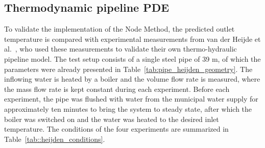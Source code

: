 


\subsection{Thermodynamic pipeline PDE}
To validate the implementation of the Node Method, the predicted outlet 
temperature is compared with experimental measurements from van der Heijde et 
al.\ \cite{VANDERHEIJDE2017158}, who used these measurements to validate their 
own thermo-hydraulic pipeline model. The test setup consists of a single steel 
pipe of 39 m, of which the parameters were already presented in 
Table~\ref{tab:pipe_heijden_geometry}. The inflowing water is heated by a 
boiler and the volume flow rate is measured, where the mass flow rate is kept 
constant during each experiment. Before each experiment, the pipe was flushed 
with water from the municipal water supply for approximately ten minutes to 
bring the system to steady state, after which the boiler was switched on and 
the water was heated to the desired inlet temperature. The conditions of the 
four experiments are summarized in Table~\ref{tab::heijden_conditions}.

